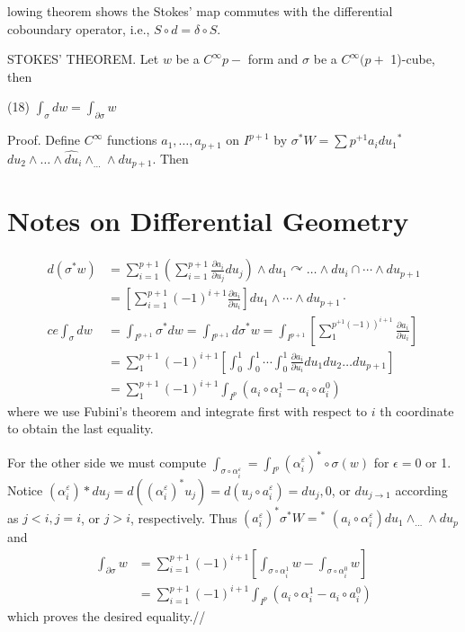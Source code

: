 \documentclass[10pt]{article}
\begin{document}
lowing theorem shows the Stokes' map commutes with the differential coboundary operator, i.e., $S \circ d=\delta \circ S$.

STOKES' THEOREM. Let $w$ be a $C^{\infty} p-$ form and $\sigma$ be a $C^{\infty}(p+$ 1)-cube, then

(18) $\int_{\sigma} d w=\int_{\partial \sigma} w$

Proof. Define $C^{\infty}$ functions $a_{1}, \ldots, a_{p+1}$ on $I^{p+1}$ by $\sigma^{*} W=\sum p^{+1} a_{i} d u_{1}{ }^{*}$ $d u_{2} \wedge \ldots \wedge \hat{d u}_{i} \wedge_{\ldots} \wedge d u_{p+1}$. Then

\section{Notes on Differential Geometry}
$$
\begin{aligned}
d\left(\sigma^{*} w\right) &=\sum_{i=1}^{p+1}\left(\sum_{i=1}^{p+1} \frac{\partial a_{i}}{\partial u_{j}} d u_{j}\right) \wedge d u_{1} \curvearrowright \ldots \wedge d u_{i} \cap \cdots \wedge d u_{p+1} \\
&=\left[\sum_{i=1}^{p+1}(-1)^{i+1} \frac{\partial a_{i}}{\partial u_{i}}\right] d u_{1} \wedge \cdots \wedge d u_{p+1} \cdot \\
c e \int_{\sigma} d w &=\int_{I^{p+1}} \sigma^{*} d w=\int_{I^{p+1}} d \sigma^{*} w=\int_{I^{p+1}}\left[\sum_{1}^{\left.p^{+1}(-1)\right)^{i+1}} \frac{\partial a_{i}}{\partial u_{i}}\right] \\
&=\sum_{1}^{p+1}(-1)^{i+1}\left[\int_{0}^{1} \int_{0}^{1} \cdots \int_{0}^{1} \frac{\partial a_{i}}{\partial u_{i}} d u_{1} d u_{2} \ldots d u_{p+1}\right] \\
&=\sum_{1}^{p+1}(-1)^{i+1} \int_{I^{p}}\left(a_{i} \circ \alpha_{i}^{1}-a_{i} \circ a_{i}^{0}\right)
\end{aligned}
$$
where we use Fubini's theorem and integrate first with respect to $i$ th coordinate to obtain the last equality.

For the other side we must compute $\int_{\sigma \circ \alpha_{i}^{\varepsilon}}=\int_{I^{p}}\left(\alpha_{i}^{\varepsilon}\right)^{*} \circ \sigma(w)$ for $\epsilon=0$ or 1. Notice $\left(\alpha_{i}^{\varepsilon}\right) * d u_{j}=d\left(\left(\alpha_{i}^{\varepsilon}\right)^{*} u_{j}\right)=d\left(u_{j} \circ a_{i}^{\varepsilon}\right)=d u_{j}, 0$, or $d u_{j \rightarrow 1}$ according as $j<i, j=i$, or $j>i$, respectively. Thus $\left(a_{i}^{\varepsilon}\right)^{*} \sigma^{*} W={ }^{*}$ $\left(a_{i} \circ \alpha_{i}^{\varepsilon}\right) d u_{1} \wedge_{\ldots} \wedge d u_{p}$ and
$$
\begin{aligned}
\int_{\partial \sigma} w &=\sum_{i=1}^{p+1}(-1)^{i+1}\left[\int_{\sigma \circ \alpha_{i}^{1}} w-\int_{\sigma \circ \alpha_{i}^{0}} w\right] \\
&=\sum_{i=1}^{p+1}(-1)^{i+1} \int_{I^{p}}\left(a_{i} \circ \alpha_{i}^{1}-a_{i} \circ a_{i}^{0}\right)
\end{aligned}
$$
which proves the desired equality.//
\end{document}
